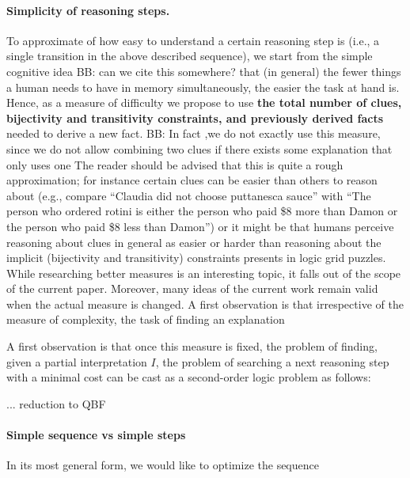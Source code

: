 \documentclass{ecai}
\newcommand\bart[1]{{\color{red}\textsc{BB}: #1}}
\begin{document}
\paragraph{Simplicity of reasoning steps.}
To approximate of how easy to understand a certain reasoning step is (i.e., a single transition in the above described sequence), we start from the simple cognitive idea \bart{can we cite this somewhere? } that (in general) the fewer things a human needs to have in memory simultaneously, the easier the task at hand is. 
Hence, as a measure of difficulty we propose to use \textbf{the total number of clues, bijectivity and transitivity constraints, and previously derived facts} needed to derive a new fact. \bart{In fact ,we do not exactly use this measure, since we do not allow combining two clues if there exists some explanation that only uses one}
The reader should be advised that this is quite a rough approximation; for instance certain clues can be easier than others to reason about (e.g., compare ``Claudia did not choose puttanesca sauce'' with ``The person who ordered rotini is either the person who paid \$8 more than Damon or the person who paid \$8 less than Damon'') or it might be that humans perceive reasoning about clues in general as easier or harder than reasoning about the implicit (bijectivity and transitivity) constraints presents in logic grid puzzles. While researching better measures is an interesting topic, it falls out of the scope of the current paper. Moreover, many ideas of the current work remain valid when the actual measure is changed. 
A first observation is that irrespective of the measure of complexity, the task of finding an explanation  


A first observation is that once this measure is fixed, the problem of finding, given a partial interpretation $I$, the problem of searching a next reasoning step with a minimal cost can be cast as a second-order logic problem as follows: 



... reduction to QBF \cite{kr/BogaertsTS16,kr/vanderHallenJ18}



\paragraph{Simple sequence vs simple steps}
In its most general form, we would like to optimize the sequence 
\end{document}
